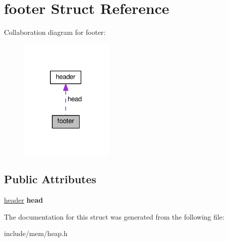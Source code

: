 \hypertarget{structfooter}{}\section{footer Struct Reference}
\label{structfooter}


Collaboration diagram for footer\+:
\nopagebreak
\begin{figure}[H]
\begin{center}
\leavevmode
\includegraphics[width=128pt]{structfooter__coll__graph}
\end{center}
\end{figure}
\subsection*{Public Attributes}
\begin{DoxyCompactItemize}
\item 
\hyperlink{structheader}{header} {\bfseries head}\hypertarget{structfooter_acae33dac61c9505ff5b850f88d32dd0b}{}\label{structfooter_acae33dac61c9505ff5b850f88d32dd0b}

\end{DoxyCompactItemize}


The documentation for this struct was generated from the following file\+:\begin{DoxyCompactItemize}
\item 
include/mem/heap.\+h\end{DoxyCompactItemize}
